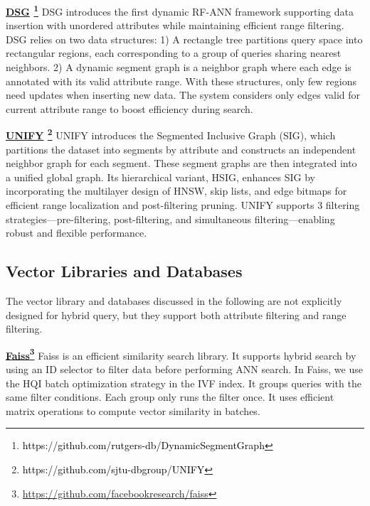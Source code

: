 \documentclass[sigconf, nonacm, pdfa]{acmart}
\begin{document}
{	\noindent\textbf{\underline{DSG} \footnote{\textcolor{black}{https://github.com/rutgers-db/DynamicSegmentGraph}}}  \cite{DSG}
	DSG introduces the first dynamic RF-ANN framework supporting data insertion with unordered attributes while maintaining efficient range filtering.
	DSG relies on two data structures: 1) A rectangle tree partitions query space into rectangular regions, each corresponding to a group of queries sharing nearest neighbors. 2) A dynamic segment graph is a neighbor graph where each edge is annotated with its valid attribute range.
	With these structures, only few regions need updates when inserting new data. The system considers only edges valid for current attribute range to boost efficiency during search.
	
	\noindent\textbf{\underline{UNIFY} \footnote{\textcolor{black}{https://github.com/sjtu-dbgroup/UNIFY}}} \cite{UNIFY}
	UNIFY introduces the Segmented Inclusive Graph (SIG), which partitions the dataset into segments by attribute and constructs an independent neighbor graph for each segment. These segment graphs are then integrated into a unified global graph. Its hierarchical variant, HSIG, enhances SIG by incorporating the multilayer design of HNSW, skip lists, and edge bitmaps for efficient range localization and post-filtering pruning. UNIFY supports 3 filtering strategies—pre-filtering, post-filtering, and  simultaneous filtering—enabling robust and flexible performance.
	
	
	
	\subsection{Vector Libraries and Databases}
The vector library and databases discussed in the following are not explicitly designed for hybrid query, but they support both attribute filtering and range filtering. 

\noindent\textbf{\underline{Faiss}\footnote{\url{https://github.com/facebookresearch/faiss}}}  \cite{Faiss}
Faiss is an efficient similarity search library. It supports hybrid search by using an ID selector to filter data before performing ANN search.
In Faiss, we use the HQI batch optimization strategy in the IVF index. It groups queries with the same filter conditions. Each group only runs the filter once. It uses efficient matrix operations to compute vector similarity in batches.

}
\end{document}

